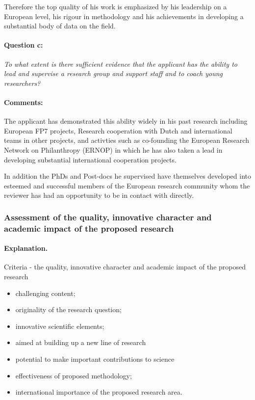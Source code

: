 \documentclass[twocolumn, serif, rga, numeric]{jote-article}
\begin{document}
Therefore the top quality of his work is emphasized by his leadership on a European level, his rigour in methodology and his achievements in developing a substantial body of data on the field.
\paragraph{Question c:}
\textit{To what extent is there sufficient evidence that the applicant has the ability to lead and supervise a research group and support staff and to coach young researchers?}
\paragraph{Comments:}
The applicant has demonstrated this ability widely in his past research including European FP7 projects, Research cooperation with Dutch and international teams in other projects, and activties such as co-founding the European Research Network on Philanthropy (ERNOP) in which he has also taken a lead in developing substantial international cooperation projects.

In addition the PhDs and Post-docs he supervised have themselves developed into esteemed and successful members of the European research community whom the reviewer has had an opportunity to be in contact with directly.

 {}\subsubsection*{Assessment of the quality, innovative character and academic impact of the proposed research} 
\paragraph{Explanation.}
Criteria - the quality, innovative character and academic impact of the proposed research 
\begin{itemize} 
\item challenging content; \item originality of the research question; \item innovative scientific elements; \item aimed at building up a new line of research\item potential to make important contributions to science\item effectiveness of proposed methodology; \item international importance of the proposed research area.
\end{itemize}
\end{document}
